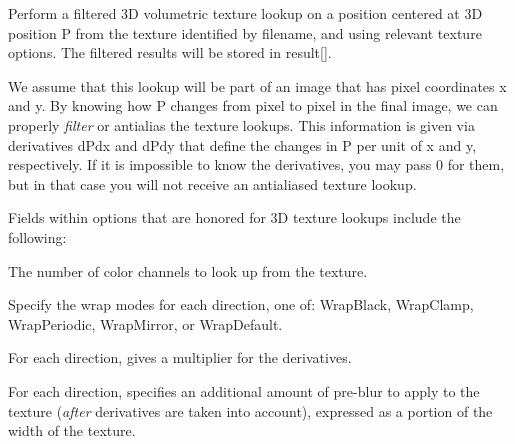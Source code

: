 
Perform a filtered 3D volumetric texture lookup on a position centered at
3D position {\cf P} from the texture identified by
{\cf filename}, and using relevant texture {\cf options}.  The filtered
results will be stored in {\cf result[]}.

We assume that this lookup will be part of an image that has pixel
coordinates {\cf x} and {\cf y}.  By knowing how {\cf P} changes from
pixel to pixel in the final image, we can properly \emph{filter} or
antialias the texture lookups.  This information is given via
derivatives {\cf dPdx} and {\cf dPdy} that define the changes in {\cf P}
per unit of {\cf x} and {\cf y}, respectively.  If it is impossible to
know the derivatives, you may pass 0 for them, but in that case you will
not receive an antialiased texture lookup.

Fields within {\cf options} that are honored for 3D texture lookups
include the following:

\vspace{-12pt}
\vspace{10pt}
The number of color channels to look up from the texture.
\apiend

\vspace{-24pt}
\vspace{10pt}
Specify the wrap modes for each direction, one of: 
{\cf WrapBlack}, {\cf WrapClamp}, {\cf WrapPeriodic}, {\cf WrapMirror},
or {\cf WrapDefault}.
\apiend

\vspace{-24pt}
\vspace{10pt}
For each direction, gives a multiplier for the derivatives.
\apiend

\vspace{-24pt}
\vspace{10pt}
For each direction, specifies an additional amount of pre-blur to apply
to the texture (\emph{after} derivatives are taken into account),
expressed as a portion of the width of the texture.
\apiend

